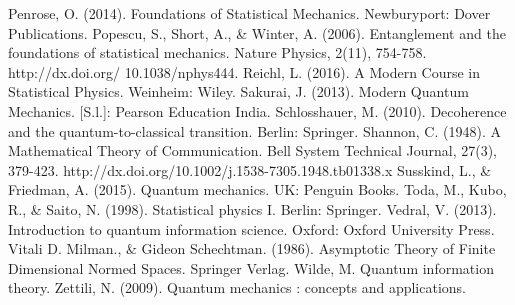 \documentclass[11pt]{book}
\theoremstyle{definition}
\begin{document}
\begin{thebibliography}{10}
Penrose, O. (2014). Foundations of Statistical Mechanics. Newburyport: Dover Publications.
 Popescu, S., Short, A., \& Winter, A. (2006). Entanglement and the foundations of statistical mechanics. Nature Physics, 2(11), 754-758. http://dx.doi.org/ 10.1038/nphys444.
Reichl, L. (2016). A Modern Course in Statistical Physics. Weinheim: Wiley.
Sakurai, J. (2013). Modern Quantum Mechanics. [S.l.]: Pearson Education India.
Schlosshauer, M. (2010). Decoherence and the quantum-to-classical transition. Berlin: Springer.
Shannon, C. (1948). A Mathematical Theory of Communication. Bell System Technical Journal, 27(3), 379-423. http://dx.doi.org/10.1002/j.1538-7305.1948.tb01338.x
Susskind, L., \& Friedman, A. (2015). Quantum mechanics. UK: Penguin Books.
Toda, M., Kubo, R., \& Saito, N. (1998). Statistical physics I. Berlin: Springer.
Vedral, V. (2013). Introduction to quantum information science. Oxford: Oxford University Press.
Vitali D. Milman., \& Gideon Schechtman. (1986). Asymptotic Theory of Finite Dimensional Normed Spaces. Springer Verlag.
Wilde, M. Quantum information theory.
Zettili, N. (2009). Quantum mechanics : concepts and applications.
\end{thebibliography}



 
\end{document}
